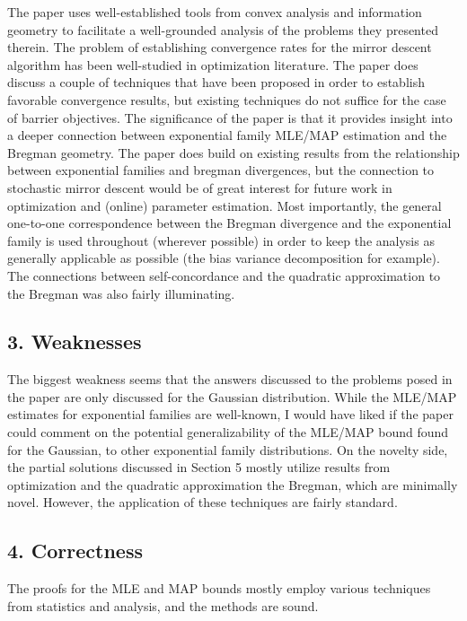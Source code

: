 The paper uses well-established tools from convex analysis and information
geometry to facilitate a well-grounded analysis of the problems they presented
therein. The problem of establishing convergence rates for the mirror descent
algorithm has been well-studied in optimization literature. The paper does
discuss a couple of techniques that have been proposed in order to establish
favorable convergence results, but existing techniques do not suffice for the
case of barrier objectives. The significance of the paper is that it provides
insight into a deeper connection between exponential family MLE/MAP estimation
and the Bregman geometry. The paper does build on existing results from the
relationship between exponential families and bregman divergences, but the
connection to stochastic mirror descent would be of great interest for future
work in optimization and (online) parameter estimation. Most importantly, the
general one-to-one correspondence between the Bregman divergence and the
exponential family is used throughout (wherever possible) in order to keep the
analysis as generally applicable as possible (the bias variance decomposition
for example). The connections between self-concordance and the quadratic
approximation to the Bregman was also fairly illuminating.

\subsection*{3. Weaknesses}

The biggest weakness seems that the answers discussed to the problems posed in
the paper are only discussed for the Gaussian distribution. While the MLE/MAP
estimates for exponential families are well-known, I would have liked if the
paper could comment on the potential generalizability of the MLE/MAP bound
found for the Gaussian, to other exponential family distributions. On the
novelty side, the partial solutions discussed in Section 5 mostly utilize
results from optimization and the quadratic approximation the Bregman, which
are minimally novel. However, the application of these techniques are fairly standard.

\subsection*{4. Correctness}

The proofs for the MLE and MAP bounds mostly employ various techniques from statistics and analysis, and the methods are sound.

